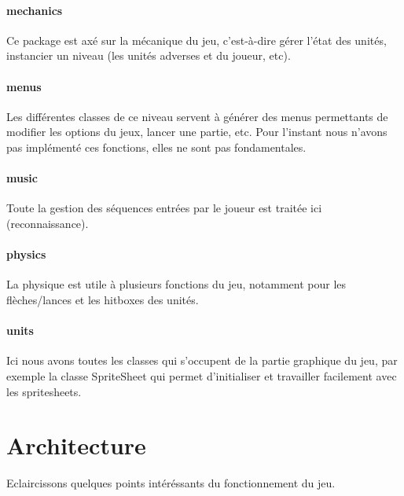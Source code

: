 \documentclass[a4paper,10pt]{article}
\begin{document}
  \paragraph{mechanics}
  Ce package est axé sur la mécanique du jeu, c'est-à-dire gérer l'état des unités, instancier un niveau (les unités adverses et du joueur, etc).
  \paragraph{menus}
  Les différentes classes de ce niveau servent à générer des menus permettants de modifier les options du jeux, lancer une partie, etc. Pour l'instant nous n'avons pas implémenté ces fonctions, elles ne sont pas fondamentales.
  \paragraph{music}
  Toute la gestion des séquences entrées par le joueur est traitée ici (reconnaissance).
  \paragraph{physics}
  La physique est utile à plusieurs fonctions du jeu, notamment pour les flèches/lances et les hitboxes des unités.
  \paragraph{units}
  Ici nous avons toutes les classes qui s'occupent de la partie graphique du jeu, par exemple la classe SpriteSheet qui permet d'initialiser et travailler facilement avec les spritesheets.
  
  \pagebreak 
  \section{Architecture}
  Eclaircissons quelques points intéréssants du fonctionnement du jeu.
\end{document}
